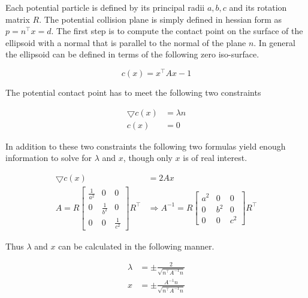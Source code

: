 Each potential particle is defined by its principal radii $a,b,c$ and its rotation matrix $R$. The potential collision plane is simply defined in hessian form as $p = n^\top x=d$. The first step is to compute the contact point on the surface of the ellipsoid with a normal that is parallel to the normal of the plane $n$. In general the ellipsoid can be defined in terms of the following zero iso-surface.

\begin{equation}
c(x) = x^\top A x - 1
\end{equation}

The potential contact point has to meet the following two constraints

\begin{align}
\bigtriangledown c(x)&=\lambda n \\
c(x) &= 0
\end{align}

In addition to these two constraints the following two formulas yield enough information to solve for $\lambda$ and $x$, though only $x$ is of real interest.

\begin{align}
\bigtriangledown c(x)&=2 A x \\
A = R \begin{bmatrix}\frac{1}{a^2} & 0 & 0 \\ 0 & \frac{1}{b^2} & 0 \\ 0 & 0 & \frac{1}{c^2}\end{bmatrix} R^\top &\Rightarrow A^{-1} = R \begin{bmatrix}a^2 & 0 & 0 \\ 0 & b^2 & 0 \\ 0 & 0 & c^2\end{bmatrix}R^\top
\end{align}

Thus $\lambda$ and $x$ can be calculated in the following manner.

\begin{align}
\lambda &= \pm \frac{2}{\sqrt{n^\top A^{-1} n}} \\
x &= \pm \frac{A^{-1}n}{\sqrt{n^\top A^{-1} n}}
\end{align}

